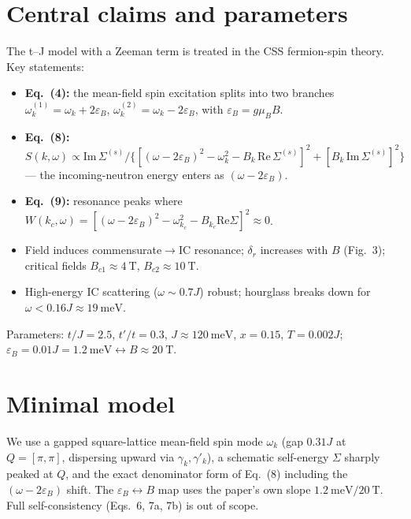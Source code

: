 \documentclass[11pt]{article}
\begin{document}
\section{Central claims and parameters}
The t--J model with a Zeeman term is treated in the CSS fermion-spin theory. Key
statements:
\begin{itemize}
  \item \textbf{Eq.~(4):} the mean-field spin excitation splits into two branches
  $\omega_k^{(1)}=\omega_k+2\varepsilon_B$, $\omega_k^{(2)}=\omega_k-2\varepsilon_B$,
  with $\varepsilon_B=g\mu_B B$.
  \item \textbf{Eq.~(8):} $S(k,\omega)\propto \mathrm{Im}\,\Sigma^{(s)}/
  \{[(\omega-2\varepsilon_B)^2-\omega_k^2-B_k\,\mathrm{Re}\,\Sigma^{(s)}]^2
  +[B_k\,\mathrm{Im}\,\Sigma^{(s)}]^2\}$ --- the incoming-neutron energy enters as
  $(\omega-2\varepsilon_B)$.
  \item \textbf{Eq.~(9):} resonance peaks where
  $W(k_c,\omega)=[(\omega-2\varepsilon_B)^2-\omega_{k_c}^2-B_{k_c}\mathrm{Re}\Sigma]^2\approx0$.
  \item Field induces commensurate$\to$IC resonance; $\delta_r$ increases with $B$
  (Fig.~3); critical fields $B_{c1}\approx\SI{4}{\tesla}$,
  $B_{c2}\approx\SI{10}{\tesla}$.
  \item High-energy IC scattering ($\omega\sim0.7J$) robust; hourglass breaks down
  for $\omega<0.16J\approx\SI{19}{\milli\electronvolt}$.
\end{itemize}
Parameters: $t/J=2.5$, $t'/t=0.3$, $J\approx\SI{120}{\milli\electronvolt}$,
$x=0.15$, $T=0.002J$; $\varepsilon_B=0.01J=\SI{1.2}{\milli\electronvolt}
\leftrightarrow B\approx\SI{20}{\tesla}$.

\section{Minimal model}
We use a gapped square-lattice mean-field spin mode $\omega_k$ (gap $0.31J$ at
$Q=[\pi,\pi]$, dispersing upward via $\gamma_k,\gamma'_k$), a schematic
self-energy $\Sigma$ sharply peaked at $Q$, and the exact denominator form of
Eq.~(8) including the $(\omega-2\varepsilon_B)$ shift. The
$\varepsilon_B\leftrightarrow B$ map uses the paper's own slope
$\SI{1.2}{\milli\electronvolt}/\SI{20}{\tesla}$. Full self-consistency (Eqs.~6,
7a, 7b) is out of scope.
\end{document}
